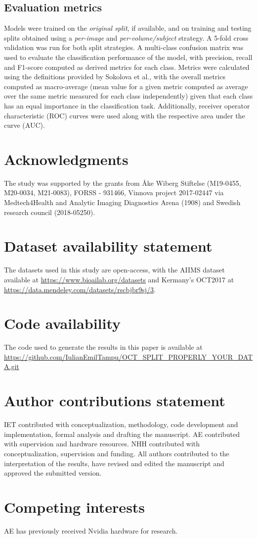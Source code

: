\documentclass[fleqn,10pt]{wlscirep}
\begin{document}
\subsection*{Evaluation metrics}
Models were trained on the \textit{original split}, if available, and on training and testing splits obtained using a \textit{per-image} and \textit{per-volume/subject} strategy. A 5-fold cross validation was run for both split strategies. A multi-class confusion matrix was used to evaluate the classification performance of the model, with precision, recall and F1-score computed as derived metrics for each class.  Metrics were calculated using the definitions provided by Sokolova et al., \cite{sokolova2009systematic} with the overall metrics computed as macro-average (mean value for a given metric computed as average over the same metric measured for each class independently) given that each class has an equal importance in the classification task. Additionally, receiver operator characteristic (ROC) curves were used along with the respective area under the curve (AUC). 

\section*{Acknowledgments}
The study was supported by the grants from Åke Wiberg Stiftelse (M19-0455, M20-0034, M21-0083), FORSS - 931466, Vinnova project 2017-02447 via Medtech4Health and Analytic Imaging Diagnostics Arena (1908) and Swedish research council (2018-05250).

\section*{Dataset availability statement}
The datasets used in this study are open-access, with the AIIMS dataset \cite{butola2019volumetric} available at \url{https://www.bioailab.org/datasets}  and Kermany’s  OCT2017 \cite{kermany2018large} at \url{https://data.mendeley.com/datasets/rscbjbr9sj/3}. 

\section*{Code availability}
The code used to generate the results in this paper is available at \url{https://github.com/IulianEmilTampu/OCT_SPLIT_PROPERLY_YOUR_DATA.git}

\section*{Author contributions statement}
IET contributed with conceptualization, methodology, code development and implementation, formal analysis and drafting the manuscript. AE contributed with supervision and hardware resources. NHH contributed with conceptualization, supervision and funding. All authors contributed to the interpretation of the results, have revised and edited the manuscript and approved the submitted version.

\section*{Competing interests}
AE has previously received Nvidia hardware for research.


\end{document}
